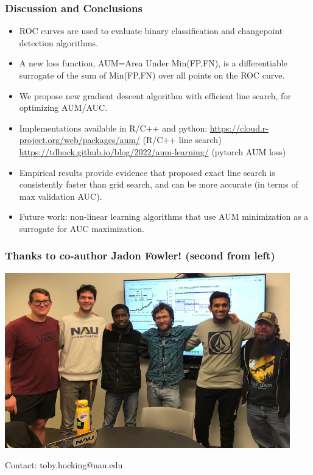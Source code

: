 \documentclass[t]{beamer}
\begin{document}
\begin{frame}
  \frametitle{Discussion and Conclusions}
  \begin{itemize}
  \item ROC curves are used to evaluate binary classification and
    changepoint detection algorithms.
  \item A new loss function, AUM=Area Under Min(FP,FN),
    is a differentiable surrogate of the sum of Min(FP,FN) over
    all points on the ROC curve.
  \item We propose new gradient descent algorithm with efficient line
    search, for optimizing AUM/AUC.
  \item Implementations available in R/C++ and python:
    {\scriptsize
    \url{https://cloud.r-project.org/web/packages/aum/} (R/C++ line search)
    \url{https://tdhock.github.io/blog/2022/aum-learning/} (pytorch AUM loss)
    }
  \item Empirical results provide evidence that proposed exact line
    search is consistently faster than grid search, and can be more
    accurate (in terms of max validation AUC).
  \item Future work: non-linear learning algorithms that use AUM
    minimization as a surrogate for AUC maximization.
  \end{itemize}
\end{frame}

\begin{frame}
  \frametitle{Thanks to co-author Jadon Fowler! (second from left)}

  \includegraphics[height=3in]{2023-02-02-group-meeting}

  Contact: toby.hocking@nau.edu

\end{frame} 
\end{document}

